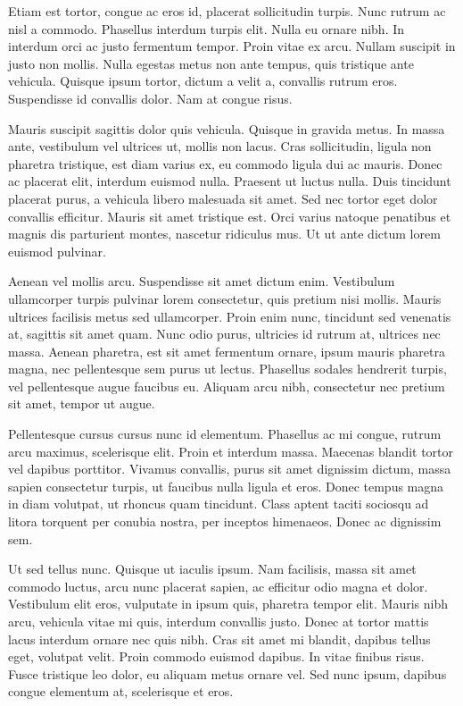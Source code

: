 \documentclass{homework}
\begin{document}
Etiam est tortor, congue ac eros id, placerat sollicitudin turpis. Nunc rutrum ac nisl a commodo. Phasellus interdum turpis elit. Nulla eu ornare nibh. In interdum orci ac justo fermentum tempor. Proin vitae ex arcu. Nullam suscipit in justo non mollis. Nulla egestas metus non ante tempus, quis tristique ante vehicula. Quisque ipsum tortor, dictum a velit a, convallis rutrum eros. Suspendisse id convallis dolor. Nam at congue risus.

Mauris suscipit sagittis dolor quis vehicula. Quisque in gravida metus. In massa ante, vestibulum vel ultrices ut, mollis non lacus. Cras sollicitudin, ligula non pharetra tristique, est diam varius ex, eu commodo ligula dui ac mauris. Donec ac placerat elit, interdum euismod nulla. Praesent ut luctus nulla. Duis tincidunt placerat purus, a vehicula libero malesuada sit amet. Sed nec tortor eget dolor convallis efficitur. Mauris sit amet tristique est. Orci varius natoque penatibus et magnis dis parturient montes, nascetur ridiculus mus. Ut ut ante dictum lorem euismod pulvinar.

Aenean vel mollis arcu. Suspendisse sit amet dictum enim. Vestibulum ullamcorper turpis pulvinar lorem consectetur, quis pretium nisi mollis. Mauris ultrices facilisis metus sed ullamcorper. Proin enim nunc, tincidunt sed venenatis at, sagittis sit amet quam. Nunc odio purus, ultricies id rutrum at, ultrices nec massa. Aenean pharetra, est sit amet fermentum ornare, ipsum mauris pharetra magna, nec pellentesque sem purus ut lectus. Phasellus sodales hendrerit turpis, vel pellentesque augue faucibus eu. Aliquam arcu nibh, consectetur nec pretium sit amet, tempor ut augue.

Pellentesque cursus cursus nunc id elementum. Phasellus ac mi congue, rutrum arcu maximus, scelerisque elit. Proin et interdum massa. Maecenas blandit tortor vel dapibus porttitor. Vivamus convallis, purus sit amet dignissim dictum, massa sapien consectetur turpis, ut faucibus nulla ligula et eros. Donec tempus magna in diam volutpat, ut rhoncus quam tincidunt. Class aptent taciti sociosqu ad litora torquent per conubia nostra, per inceptos himenaeos. Donec ac dignissim sem.

Ut sed tellus nunc. Quisque ut iaculis ipsum. Nam facilisis, massa sit amet commodo luctus, arcu nunc placerat sapien, ac efficitur odio magna et dolor. Vestibulum elit eros, vulputate in ipsum quis, pharetra tempor elit. Mauris nibh arcu, vehicula vitae mi quis, interdum convallis justo. Donec at tortor mattis lacus interdum ornare nec quis nibh. Cras sit amet mi blandit, dapibus tellus eget, volutpat velit. Proin commodo euismod dapibus. In vitae finibus risus. Fusce tristique leo dolor, eu aliquam metus ornare vel. Sed nunc ipsum, dapibus congue elementum at, scelerisque et eros.
\end{document}
